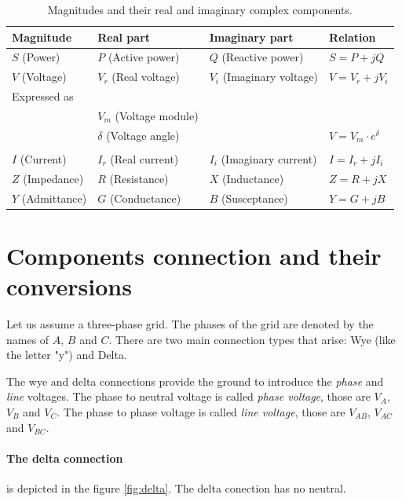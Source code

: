 \documentclass{tufte-book}
\begin{document}
\begin{table}[h]
\begin{center}
\footnotesize
\begin{tabular}{llll}
\toprule
Magnitude & Real part & Imaginary part & Relation\\
\midrule
$S$ (Power) & $P$ (Active power) & $Q$ (Reactive power) & $S=P +jQ$\\
$V$ (Voltage) & $V_r$ (Real voltage) & $V_i$ (Imaginary voltage) & $V=V_r +jV_i$\\
Expressed as  &  &  & \\
 & $V_m$ (Voltage module) &  & \\
 & $\delta$ (Voltage angle) &  & $V = V_m \cdot e^\delta$\\
  &  &  & \\
$I$ (Current) & $I_r$ (Real current) & $I_i$ (Imaginary current) & $I=I_r +jI_i$\\
$Z$ (Impedance) & $R$ (Resistance) & $X$ (Inductance) & $Z=R +jX$\\
$Y$ (Admittance) & $G$ (Conductance) & $B$ (Susceptance) & $Y=G +jB$\\
\bottomrule
\end{tabular}
\end{center}
  \caption{Magnitudes and their real and imaginary complex components.}
  \label{real_imaginary_table}
\end{table}






\section{Components connection and their conversions}

Let us assume a three-phase grid. The phases of the grid are denoted by the names of $A$, $B$ and $C$. There are two main connection types that arise: Wye (like the letter "y") and Delta.

The wye and delta connections provide the ground to introduce the \textit{phase} and \textit{line} voltages. The phase to neutral voltage is called \textit{phase voltage}, those are $V_A$, $V_B$ and $V_C$. The phase to phase voltage is called \textit{line voltage}, those are $V_{AB}$, $V_{AC}$ and $V_{BC}$.

\paragraph{The delta connection} is depicted in the figure \ref{fig:delta}. The delta conection has no neutral.
\end{document}
